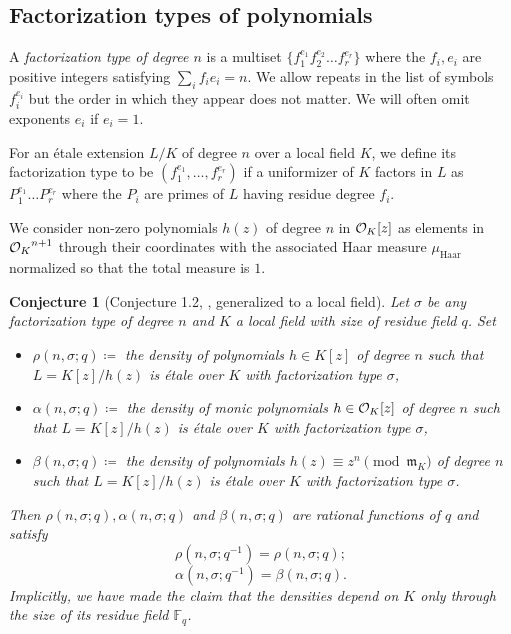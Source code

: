 \documentclass[10pt]{article}
\theoremstyle{plain}
\newtheorem{conjecture}[theorem]{Conjecture}
\theoremstyle{definition}
\numberwithin{equation}{section}
\begin{document}
\subsection{Factorization types of polynomials}

A \emph{factorization type of degree $n$} is a multiset $\{f_1^{e_1}f_2^{e_2}\dots f_r^{e_r}\}$ where the $f_i,e_i$ are positive integers satisfying $\sum_i f_ie_i = n$. We allow repeats in the list of symbols $f_i^{e_i}$ but the order in which they appear does not matter. We will often omit exponents $e_i$ if $e_i = 1$. 

For an \'etale extension $L/K$ of degree $n$ over a local field $K$, we define its factorization type to be $(f_1^{e_1},\dots,f_r^{e_r})$ if a uniformizer of $K$ factors in $L$ as $P_1^{e_1}\dots P_r^{e_r}$ where the $P_i$ are primes of $L$ having residue degree $f_i$. 

We consider non-zero polynomials $h(z)$ of degree $n$ in ${{\mathcal O}_{K}}[z]$ as elements in ${{\mathcal O}_{K}}^{n+1}$ through their coordinates with the associated Haar measure $\mu_{\mathrm{Haar}}$ normalized so that the total measure is $1$. 

\begin{conjecture}[Conjecture 1.2, \cite{bhargava2022density}, generalized to a local field]\label{conj: bhargava}
Let $\sigma$ be any factorization type of degree $n$ and $K$ a local field with size of residue field $q$. Set
\begin{itemize}
    \item $\rho(n,\sigma;q) \coloneqq$ the density of polynomials $h \in K[z]$ of degree $n$ such that $L = K[z]/h(z)$ is \'etale over $K$ with factorization type $\sigma$,
    \item $\alpha(n,\sigma;q) \coloneqq$ the density of monic polynomials $h \in { {\mathcal O} _{K}}[z]$ of degree $n$ such that $L = K[z]/h(z)$ is \'etale over $K$ with factorization type $\sigma$,
    \item $\beta(n,\sigma;q) \coloneqq$ the density of polynomials $h(z) \equiv z^n \pmod{\mathfrak m_K}$ of degree $n$ such that $L = K[z]/h(z)$ is \'etale over $K$ with factorization type $\sigma$.
\end{itemize}
Then $\rho(n,\sigma;q), \alpha(n,\sigma;q)$ and $\beta(n,\sigma;q)$ are rational functions of $q$ and satisfy
\begin{equation}\label{eqn: symmetry for rho}
    \rho(n,\sigma;q^{-1}) = \rho(n,\sigma;q);
\end{equation}
\begin{equation}\label{eqn: symmetry for alpha}
    \alpha(n,\sigma;q^{-1}) = \beta(n,\sigma;q).
\end{equation}
Implicitly, we have made the claim that the densities depend on $K$ only through the size of its residue field $\mathbb F_q$.
\end{conjecture}
\end{document}
